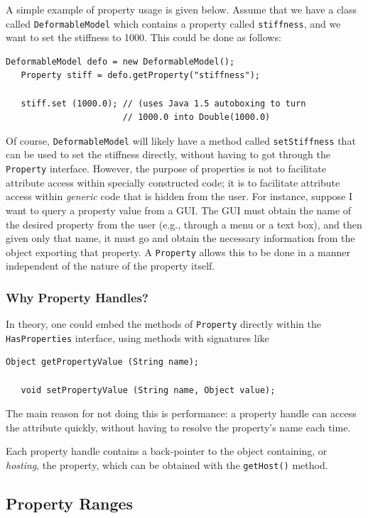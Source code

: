 \documentclass{article}
\begin{document}
A simple example of property usage is given below. Assume that we have
a class called {\tt DeformableModel} which contains a property called
{\tt stiffness}, and we want to set the stiffness to 1000. This
could be done as follows:
\begin{lstlisting}[]
   DeformableModel defo = new DeformableModel();    
   Property stiff = defo.getProperty("stiffness");

   stiff.set (1000.0); // (uses Java 1.5 autoboxing to turn
                       // 1000.0 into Double(1000.0)
\end{lstlisting}
Of course, {\tt DeformableModel} will likely have a method called
{\tt setStiffness} that can be used to set the stiffness directly, without
having to got through the {\tt Property} interface.  However, the
purpose of properties is not to facilitate attribute access within
specially constructed code; it is to facilitate attribute access
within {\it generic} code that is hidden from the user. For instance,
suppose I want to query a property value from a GUI. The GUI must
obtain the name of the desired property from the user (e.g., through a
menu or a text box), and then given only that name, it must go and
obtain the necessary information from the object exporting that
property.  A {\tt Property} allows this to be done in a manner
independent of the nature of the property itself.

\subsubsection{Why Property Handles?}

In theory, one could embed the methods of {\tt Property}
directly within the {\tt HasProperties} interface, using
methods with signatures like 
\begin{lstlisting}[]
   Object getPropertyValue (String name);

   void setPropertyValue (String name, Object value);
\end{lstlisting}
The main reason for not doing this is performance: a property handle
can access the attribute quickly, without having to resolve the
property's name each time. 

Each property handle contains a back-pointer to the object containing,
or {\it hosting}, the property, which can be obtained with the 
{\tt getHost()} method.

\label{rangesSec}
\subsection{Property Ranges}
\end{document}
